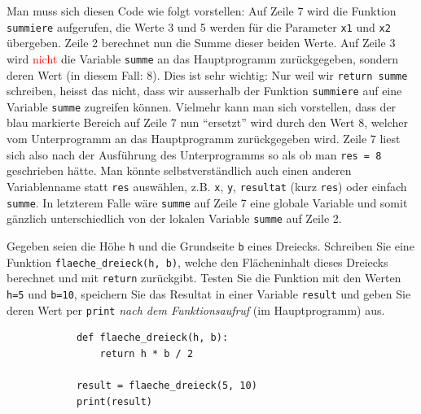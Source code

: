 \begin{myexample}
\begin{myattention}
	Man muss sich diesen Code wie folgt vorstellen: Auf Zeile 7 wird die Funktion \lstinline|summiere| aufgerufen, die Werte 3 und 5 werden für die Parameter \lstinline|x1| und \lstinline|x2| übergeben. Zeile 2 berechnet nun die Summe dieser beiden Werte. Auf Zeile 3 wird \textcolor{red}{nicht} die Variable \lstinline|summe| an das Hauptprogramm zurückgegeben, sondern deren Wert (in diesem Fall: 8). Dies ist sehr wichtig: Nur weil wir \lstinline|return summe| schreiben, heisst das nicht, dass wir ausserhalb der Funktion \lstinline|summiere| auf eine Variable \lstinline|summe| zugreifen können. Vielmehr kann man sich vorstellen, dass der blau markierte Bereich auf Zeile 7 nun \enquote{ersetzt} wird durch den Wert 8, welcher vom Unterprogramm an das Hauptprogramm zurückgegeben wird. Zeile 7 liest sich also nach der Ausführung des Unterprogramms so als ob man \lstinline|res = 8| geschrieben hätte. Man könnte selbstverständlich auch einen anderen Variablenname statt \lstinline|res| auswählen, z.B. \lstinline|x|, \lstinline|y|, \lstinline|resultat| (kurz  \lstinline|res|) oder einfach \lstinline|summe|. In letzterem Falle wäre \lstinline|summe| auf Zeile 7 eine globale Variable und somit gänzlich unterschiedlich von der lokalen Variable \lstinline|summe| auf Zeile 2.
\end{myattention}
\end{myexample}

\begin{myexercise}\label{ex:dreieck-return}
	Gegeben seien die Höhe \texttt{h} und die Grundseite \texttt{b} eines Dreiecks. Schreiben Sie eine Funktion \lstinline|flaeche_dreieck(h, b)|, welche den Flächeninhalt dieses Dreiecks berechnet und mit \lstinline|return| zurückgibt. Testen Sie die Funktion mit den Werten \lstinline|h=5| und \lstinline|b=10|, speichern Sie das Resultat in einer Variable \lstinline|result| und geben Sie deren Wert per \lstinline|print| \textit{nach dem Funktionsaufruf} (im Hauptprogramm) aus.

	\begin{myanswer}
		\begin{lstlisting}
			def flaeche_dreieck(h, b):
				return h * b / 2

			result = flaeche_dreieck(5, 10)
			print(result)
	\end{lstlisting}
	\end{myanswer}
\end{myexercise}

